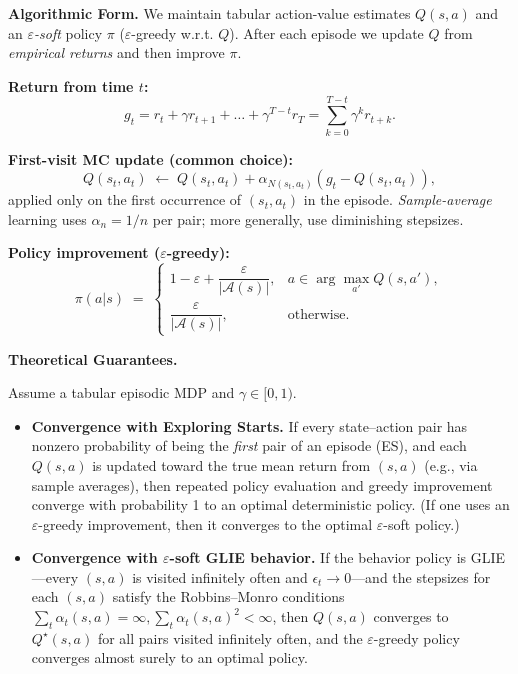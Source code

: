 \documentclass[
]{book}
\theoremstyle{definition}
\theoremstyle{definition}
\theoremstyle{definition}
\theoremstyle{definition}
\theoremstyle{remark}
\begin{document}
\textbf{Algorithmic Form.}
We maintain tabular action-value estimates \(Q(s,a)\) and an \emph{\(\varepsilon\)-soft} policy \(\pi\) (\(\varepsilon\)-greedy w.r.t. \(Q\)). After each episode we update \(Q\) from \emph{empirical returns} and then improve \(\pi\).

\textbf{Return from time \(t\):}
\[
g_t = r_t + \gamma r_{t+1} + \dots + \gamma^{T-t} r_T = \sum_{k=0}^{T-t} \gamma^{k} r_{t+k}.
\]

\textbf{First-visit MC update (common choice):}
\begin{equation}
Q(s_t,a_t) \;\leftarrow\; Q(s_t,a_t) + \alpha_{N(s_t,a_t)}\!\left(g_t - Q(s_t,a_t)\right),
\label{eq:MCControl-QUpdate}
\end{equation}
applied only on the first occurrence of \((s_t,a_t)\) in the episode. \emph{Sample-average} learning uses \(\alpha_n = 1/n\) per pair; more generally, use diminishing stepsizes.

\textbf{Policy improvement (\(\varepsilon\)-greedy):}
\begin{equation}
\pi(a|s) \;=\;
\begin{cases}
1-\varepsilon + \dfrac{\varepsilon}{|\mathcal{A}(s)|}, & a \in \arg\max_{a'} Q(s,a'), \\
\dfrac{\varepsilon}{|\mathcal{A}(s)|}, & \text{otherwise}.
\end{cases}
\label{eq:MCControl-PI}
\end{equation}

\textbf{Theoretical Guarantees.}

Assume a tabular episodic MDP and \(\gamma \in [0,1)\).

\begin{itemize}
\item
  \textbf{Convergence with Exploring Starts.} If every state--action pair has nonzero probability of being the \emph{first} pair of an episode (ES), and each \(Q(s,a)\) is updated toward the true mean return from \((s,a)\) (e.g., via sample averages), then repeated policy evaluation and greedy improvement converge with probability 1 to an optimal deterministic policy. (If one uses an \(\varepsilon\)-greedy improvement, then it converges to the optimal \(\varepsilon\)-soft policy.)
\item
  \textbf{Convergence with \(\varepsilon\)-soft GLIE behavior.} If the behavior policy is GLIE---every \((s,a)\) is visited infinitely often and \(\epsilon_t \to 0\)---and the stepsizes for each \((s,a)\) satisfy the Robbins--Monro conditions \(\sum_{t} \alpha_t(s,a) = \infty,\sum_{t} \alpha_t(s,a)^2 < \infty\), then \(Q(s,a)\) converges to \(Q^\star(s,a)\) for all pairs visited infinitely often, and the \(\varepsilon\)-greedy policy converges almost surely to an optimal policy.
\end{itemize}
\end{document}
